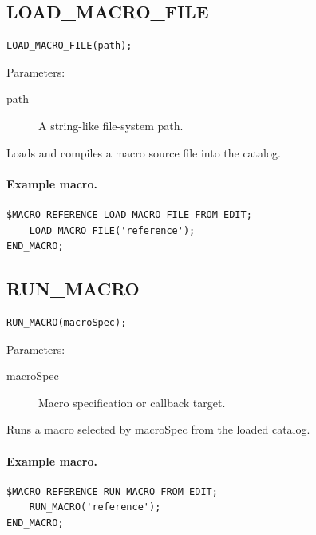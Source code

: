 \documentclass[a4paper,10pt,twoside,openany]{book}
\begin{document}
\label{prim:procedure-load-macro-file}
\subsection*{LOAD\_MACRO\_FILE}
\begin{verbatim}
LOAD_MACRO_FILE(path);
\end{verbatim}
Parameters:
\begin{description}
\item[path] A string-like file-system path.
\end{description}

Loads and compiles a macro source file into the catalog.

\paragraph{Example macro.}
\begin{verbatim}
$MACRO REFERENCE_LOAD_MACRO_FILE FROM EDIT;
    LOAD_MACRO_FILE('reference');
END_MACRO;
\end{verbatim}


\label{prim:procedure-run-macro}
\subsection*{RUN\_MACRO}
\begin{verbatim}
RUN_MACRO(macroSpec);
\end{verbatim}
Parameters:
\begin{description}
\item[macroSpec] Macro specification or callback target.
\end{description}

Runs a macro selected by macroSpec from the loaded catalog.

\paragraph{Example macro.}
\begin{verbatim}
$MACRO REFERENCE_RUN_MACRO FROM EDIT;
    RUN_MACRO('reference');
END_MACRO;
\end{verbatim}
\end{document}
